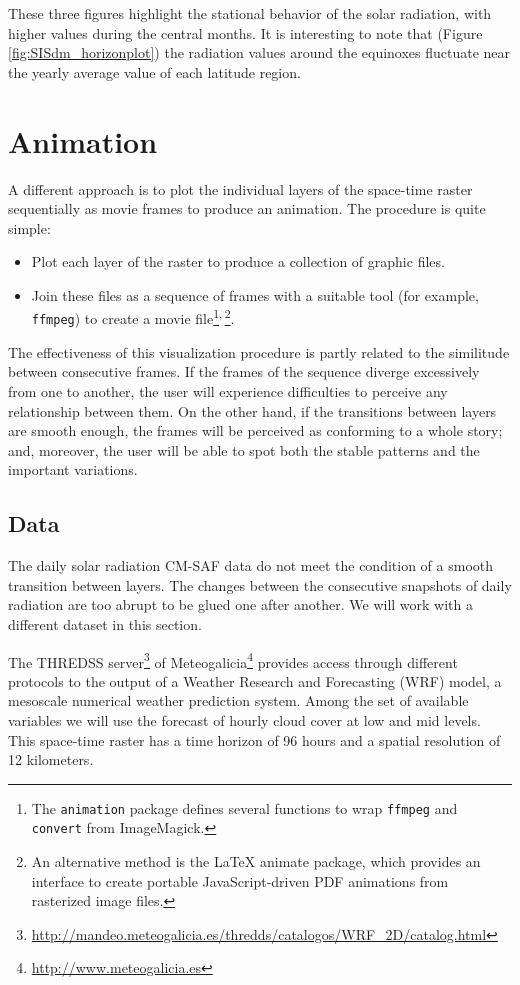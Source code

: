 These three figures highlight the stational behavior of the solar
radiation, with higher values during the central months. It is
interesting to note that (Figure \ref{fig:SISdm_horizonplot}) the
radiation values around the equinoxes fluctuate near the yearly
average value of each latitude region.
\section{Animation}
\label{sec-5}
\label{sec:animationST}

A different approach is to plot the individual layers of the
space-time raster sequentially as movie frames to produce an
animation. The procedure is quite simple:
\begin{itemize}
\item Plot each layer of the raster to produce a collection of graphic
files.
\item Join these files as a sequence of frames with a suitable tool (for
example, \texttt{ffmpeg}) to create a movie file\footnote{The \texttt{animation} package \cite{Xie2013} defines several functions to wrap \texttt{ffmpeg} and \texttt{convert} from ImageMagick.}\textsuperscript{,}\,\footnote{An alternative method is the \LaTeX{} animate package, which
provides an interface to create portable JavaScript-driven PDF
animations from rasterized image files.}.
\end{itemize}


The effectiveness of this visualization procedure is partly related to
the similitude between consecutive frames. If the frames of the
sequence diverge excessively from one to another, the user will
experience difficulties to perceive any relationship between them. On
the other hand, if the transitions between layers are smooth enough,
the frames will be perceived as conforming to a whole story; and,
moreover, the user will be able to spot both the stable patterns and
the important variations.

\subsection{Data}
\label{sec-5-1}
The daily solar radiation CM-SAF data do not meet the condition of
a smooth transition between layers. The changes between the consecutive
snapshots of daily radiation are too abrupt to be glued one after
another. We will work with a different dataset in this section.

The THREDSS server\footnote{\url{http://mandeo.meteogalicia.es/thredds/catalogos/WRF_2D/catalog.html}} of Meteogalicia\footnote{\url{http://www.meteogalicia.es}} provides access
through different protocols to the output of a Weather Research
and Forecasting (WRF) model, a mesoscale numerical weather
prediction system. Among the set of available variables we will
use the forecast of hourly cloud cover at low and mid levels. This
space-time raster has a time horizon of 96 hours and a spatial
resolution of 12 kilometers.

